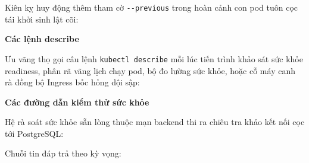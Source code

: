 Kiên kỵ huy động thêm tham cờ \texttt{-\/\allowbreak{}-previous} trong hoàn cảnh con
pod tuôn cọc tái khởi sinh lật cõi:

\begin{Shaded}
\begin{Highlighting}[]
 \OperatorTok{=}
\end{Highlighting}
\end{Shaded}

\vspace{0.5em}\noindent\textbf{Các lệnh describe}\par

Ưu vãng thọ gọi câu lệnh \texttt{kubectl\ describe} mỗi lúc tiến trình
khảo sát sức khỏe readiness, phân rã vãng lịch chạy pod, bộ đo lường sức
khỏe, hoặc cỗ máy canh rà đồng bộ Ingress bốc hỏng dội sập:

\begin{Shaded}
\begin{Highlighting}[]
\end{Highlighting}
\end{Shaded}

\vspace{0.5em}\noindent\textbf{Các đường dẫn kiểm thử sức
khỏe}\par

Hệ rà soát sức khỏe sẵn lòng thuộc mạn backend thi ra chiêu tra khảo kết
nối cọc tới PostgreSQL:

\begin{Shaded}
\begin{Highlighting}[]
 
\end{Highlighting}
\end{Shaded}

Chuỗi tin đáp trả theo kỳ vọng:

\begin{Shaded}
\begin{Highlighting}[]
\FunctionTok{\{}\FunctionTok{:}\FunctionTok{,}\FunctionTok{:}\FunctionTok{,}\FunctionTok{:\{}\FunctionTok{:}\FunctionTok{\}\}}
\end{Highlighting}
\end{Shaded}

